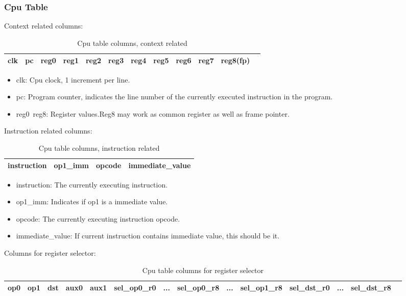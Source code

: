 \subsubsection{Cpu Table} \label{sec:cpu-table}

Context related columns:
\begin{table}[!ht]
    \centering
    \begin{tabular}{|c|c|c|c|c|c|c|c|c|c|c|c|}
        \hline
        clk & pc & reg0 & reg1 & reg2 & reg3 & reg4 & reg5 & reg6 & reg7 & reg8(fp) \\
        \hline
    \end{tabular}
    \caption{Cpu table columns, context related}
    \label{table:cpu-columns-context}
\end{table}

\begin{itemize}
    \item clk: Cpu clock, 1 increment per line.
    \item pc: Program counter, indicates the line number of the currently executed instruction in the program.
    \item reg0~reg8: Register values.Reg8 may work as common register as well as frame pointer.
\end{itemize}

Instruction related columns:
\begin{table}[!ht]
    \centering
    \begin{tabular}{|c|c|c|c|}
        \hline
        instruction & op1\_imm & opcode & immediate\_value \\
        \hline
    \end{tabular}
    \caption{Cpu table columns, instruction related}
    \label{table:cpu-columns-instruction}
\end{table}

\begin{itemize}
    \item instruction: The currently executing instruction.
    \item op1\_imm: Indicates if op1 is a immediate value.
    \item opcode: The currently executing instruction opcode.
    \item immediate\_value: If current instruction contains immediate value, this should be it.
\end{itemize}

Columns for register selector:
\begin{table}[!ht]
    \centering
    \begin{tabular}{|c|c|c|c|c|c|c|c|c|c|c|c|c|c|}
        \hline
        op0 & op1 & dst & aux0 & aux1 & sel\_op0\_r0 & ... & sel\_op0\_r8 & ... & sel\_op1\_r8 & sel\_dst\_r0 & ... & sel\_dst\_r8 \\
        \hline
    \end{tabular}
    \caption{Cpu table columns for register selector}
    \label{table:cpu-columns-reg-selector}
\end{table}

